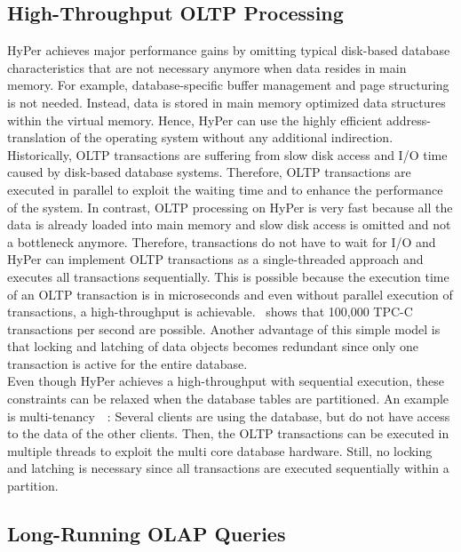 \subsection{High-Throughput OLTP Processing}
HyPer achieves major performance gains by omitting typical disk-based database characteristics that are not necessary anymore when data resides in main memory. For example, database-specific buffer management and page structuring is not needed. Instead, data is stored in main memory optimized data structures within the virtual memory. Hence, HyPer can use the highly efficient address-translation of the operating system without any additional indirection.
\\
Historically, OLTP transactions are suffering from slow disk access and I/O time caused by disk-based database systems. Therefore, OLTP transactions are executed in parallel to exploit the waiting time and to enhance the performance of the system.
In contrast, OLTP processing on HyPer is very fast because all the data is already loaded into main memory and slow disk access is omitted and not a bottleneck anymore. Therefore, transactions do not have to wait for I/O and HyPer can implement OLTP transactions as a single-threaded approach and executes all transactions sequentially. This is possible because the execution time of an OLTP transaction is in microseconds and even without parallel execution of transactions, a high-throughput is achievable.~\parencite{brawnywimpy} shows that 100,000 TPC-C transactions per second are possible. Another advantage of this simple model is that locking and latching of data objects becomes redundant since only one transaction is active for the entire database. 
\\
Even though HyPer achieves a high-throughput with sequential execution, these constraints can be relaxed when the database tables are partitioned. An example is multi-tenancy~\parencite{mt1}~\parencite{mt2}: Several clients are using the database, but do not have access to the data of the other clients. Then, the OLTP transactions can be executed in multiple threads to exploit the multi core database hardware. Still, no locking and latching is necessary since all transactions are executed sequentially within a partition.

\subsection{Long-Running OLAP Queries}

